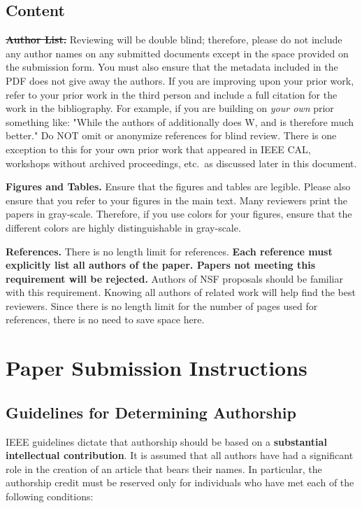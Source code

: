 \documentclass{sig-alternate}
\begin{document}
\subsection{Content}

\noindent\textbf{\sout{Author List.}} Reviewing will be double blind;
therefore, please do not include any author names on any submitted
documents except in the space provided on the submission form.  You must
also ensure that the metadata included in the PDF does not give away the
authors. If you are improving upon your prior work, refer to your prior
work in the third person and include a full citation for the work in the
bibliography.  For example, if you are building on {\em your own} prior
something like: "While the authors of
additionally does W, and is therefore much better."  Do NOT omit or
anonymize references for blind review.  There is one exception to this for
your own prior work that appeared in IEEE CAL, workshops without archived
proceedings, etc.\, as discussed later in this document.

\noindent\textbf{Figures and Tables.} Ensure that the figures and tables
are legible.  Please also ensure that you refer to your figures in the main
text.  Many reviewers print the papers in gray-scale. Therefore, if you use
colors for your figures, ensure that the different colors are highly
distinguishable in gray-scale.

\noindent\textbf{References.}  There is no length limit for references.
{\bf Each reference must explicitly list all authors of the paper.  Papers
not meeting this requirement will be rejected.} Authors of NSF proposals
should be familiar with this requirement. Knowing all authors of related
work will help find the best reviewers. Since there is no length limit
for the number of pages used for references, there is no need to save space
here.

\section{Paper Submission Instructions}

\subsection{Guidelines for Determining Authorship}


IEEE guidelines dictate that authorship should be based on a {\bf
  substantial intellectual contribution}. It is assumed that all
authors have had a significant role in the creation of an article that
bears their names. In particular, the authorship credit must be
reserved only for individuals who have met each of the following
conditions:
\end{document}

